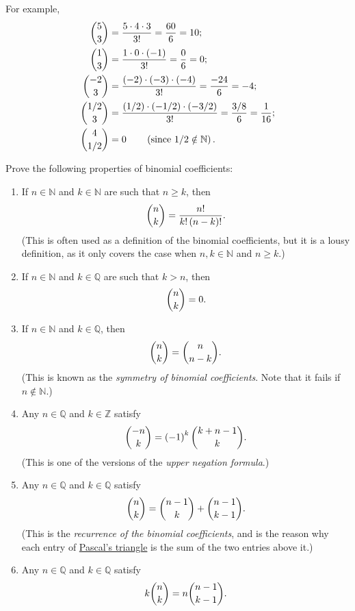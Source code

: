 \documentclass[paper=a4, fontsize=12pt]{scrartcl} %
\newcommand{\QQ}{\mathbb{Q}} %
\newcommand{\NN}{\mathbb{N}} %
\newcommand{\ZZ}{\mathbb{Z}} %
\newcommand{\tup}[1]{\left( #1 \right)}
\theoremstyle{plainsl}
\theoremstyle{definition}
\theoremstyle{remark}
\begin{document}
For example,
\begin{align*}
\dbinom{5}{3} &= \dfrac{5 \cdot 4 \cdot 3}{3!} = \dfrac{60}{6} = 10; \\
\dbinom{1}{3} &= \dfrac{1 \cdot 0 \cdot \tup{-1}}{3!} = \dfrac{0}{6} = 0; \\
\dbinom{-2}{3} &= \dfrac{\tup{-2} \cdot \tup{-3} \cdot \tup{-4}}{3!} = \dfrac{-24}{6} = -4; \\
\dbinom{1/2}{3} &= \dfrac{\tup{1/2} \cdot \tup{-1/2} \cdot \tup{-3/2}}{3!} = \dfrac{3/8}{6} = \dfrac{1}{16}; \\
\dbinom{4}{1/2} &= 0 \qquad \tup{\text{since $1/2 \notin \NN$}} .
\end{align*}

Prove the following properties of binomial coefficients:

\begin{enumerate}

\item[\textbf{(a)}]
If $n \in \NN$ and $k \in \NN$ are such that $n \geq k$,
then
\[
\dbinom{n}{k}
= \dfrac{n!}{k! \tup{n-k}!} .
\]
(This is often used as a definition of the binomial coefficients,
but it is a lousy definition, as it
only covers the case when $n, k \in \NN$ and $n \geq k$.)

\item[\textbf{(b)}]
If $n \in \NN$ and $k \in \QQ$ are such that $k > n$, then
\[
\dbinom{n}{k} = 0.
\]

\item[\textbf{(c)}]
If $n \in \NN$ and $k \in \QQ$, then
\begin{align}
\dbinom{n}{k} = \dbinom{n}{n-k} .
\label{eq.exe.binom.101.c}
\end{align}
(This is known as the \textit{symmetry of binomial coefficients}.
Note that it fails if $n \notin \NN$.)

\item[\textbf{(d)}]
Any $n \in \QQ$ and $k \in \ZZ$ satisfy
\begin{align}
\dbinom{-n}{k} = \tup{-1}^k \dbinom{k + n - 1}{k} .
\label{eq.exe.binom.101.d}
\end{align}
(This is one of the versions of the \textit{upper negation formula}.)

\item[\textbf{(e)}]
Any $n \in \QQ$ and $k \in \QQ$ satisfy
\begin{align}
\dbinom{n}{k} = \dbinom{n-1}{k} + \dbinom{n-1}{k-1} .
\label{eq.exe.binom.101.e}
\end{align}
(This is the \textit{recurrence of the binomial coefficients},
and is the reason why each entry of
\href{https://en.wikipedia.org/wiki/Pascal%27s_triangle}{Pascal's triangle}
is the sum of the two entries above it.)

\item[\textbf{(f)}]
Any $n \in \QQ$ and $k \in \QQ$ satisfy
\begin{align}
k \dbinom{n}{k} = n \dbinom{n-1}{k-1} .
\label{eq.exe.binom.101.f}
\end{align}

\end{enumerate}
\end{document}

